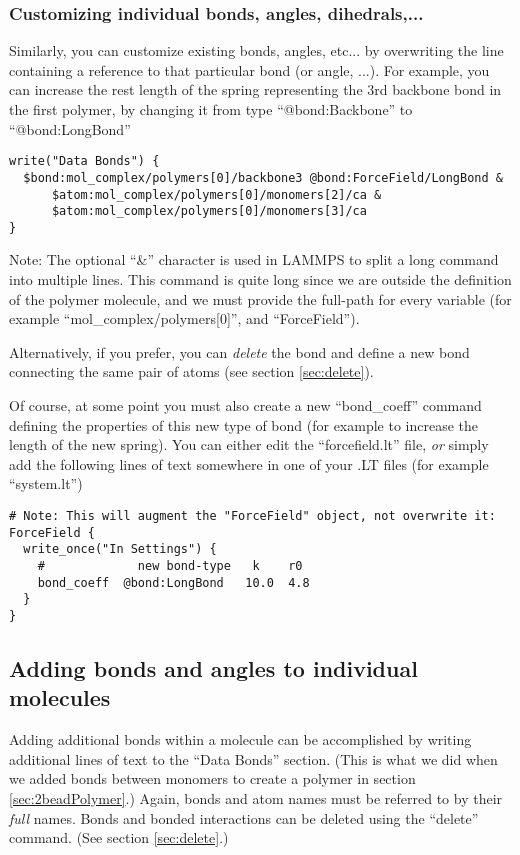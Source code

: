 \documentclass[11pt]{article}
\begin{document}
\subsubsection{Customizing individual bonds, angles, dihedrals,...}
\label{sec:custom_bond}
Similarly, you can customize existing bonds, angles, etc... by overwriting the
line containing a reference to that particular bond (or angle, ...).
For example, you can increase the rest length of the spring representing
the 3rd backbone bond in the first polymer, 
by changing it from type ``@bond:Backbone'' to ``@bond:LongBond''
\begin{verbatim}
write("Data Bonds") {
  $bond:mol_complex/polymers[0]/backbone3 @bond:ForceField/LongBond &
      $atom:mol_complex/polymers[0]/monomers[2]/ca &
      $atom:mol_complex/polymers[0]/monomers[3]/ca 
}
\end{verbatim}
Note: The optional ``\&'' character is used in LAMMPS to split a long command
into multiple lines.
This command is quite long since we are outside the definition
of the polymer molecule, and we must provide the full-path for every variable
(for example ``mol\_complex/polymers[0]'', and ``ForceField'').

Alternatively, if you prefer, you can \textit{delete} the bond 
and define a new bond connecting the same pair of atoms
(see section \ref{sec:delete}).

Of course, at some point you must also create a new ``bond\_coeff''
command defining the properties of this new type of bond
(for example to increase the length of the new spring).
You can either edit the ``forcefield.lt'' file,
\textit{or} simply add the following lines
of text somewhere in one of your .LT files (for example ``system.lt'')
\begin{verbatim}
# Note: This will augment the "ForceField" object, not overwrite it:
ForceField { 
  write_once("In Settings") {
    #             new bond-type   k    r0
    bond_coeff  @bond:LongBond   10.0  4.8
  }
}
\end{verbatim}



\subsection{Adding bonds and angles to individual molecules}
\label{sec:adding_atoms_bonds}
Adding additional bonds within a molecule can be accomplished
by writing additional lines of text to the ``Data Bonds'' section.
(This is what we did when we added bonds between monomers to create a polymer
 in section \ref{sec:2beadPolymer}.)
Again, bonds and atom names must be referred to by their \textit{full} names.
Bonds and bonded interactions can be deleted using the ``delete'' command.
(See section \ref{sec:delete}.)
\end{document}
